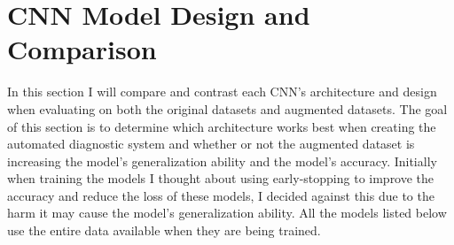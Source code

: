 \section{CNN Model Design and Comparison}
In this section I will compare and contrast each CNN's architecture and design when evaluating on both the original datasets and augmented datasets.  The goal of this section is to determine which architecture works best when creating the automated diagnostic system and whether or not the augmented dataset is increasing the model's generalization ability and the model's accuracy. Initially when training the models I thought about using early-stopping to improve the accuracy and reduce the loss of these models, I decided against this due to the harm it may cause the model's generalization ability.  All the models listed below use the entire data available when they are being trained.
